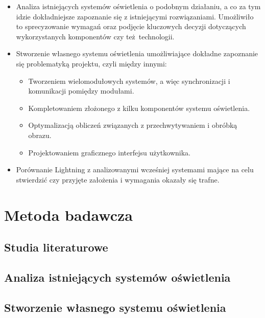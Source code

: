 \documentclass[12pt]{report}
\begin{document}
\begin{itemize}
	\item Analiza istniejących systemów oświetlenia o podobnym działaniu, a co za tym idzie dokładniejsze zapoznanie się z istniejącymi rozwiązaniami. Umożliwiło to sprecyzowanie wymagań oraz podjęcie kluczowych decyzji do\-tyczą\-cych wykorzystanych komponentów czy też technologii.
	\item Stworzenie własnego systemu oświetlenia umożliwiające dokładne zapoznanie się problematyką projektu, czyli między innymi:
	\begin{itemize}
		\item Tworzeniem wielomodułowych systemów, a więc synchronizacji i komunikacji pomiędzy modułami.
		\item Kompletowaniem złożonego z kilku komponentów systemu oświetlenia.
		\item Optymalizacją obliczeń związanych z przechwytywaniem i obróbką obrazu.
		\item Projektowaniem graficznego interfejsu użytkownika.
	\end{itemize}
	\item Porównanie Lightning z analizowanymi wcześniej systemami mające na celu stwierdzić czy przyjęte założenia i wymagania okazały się trafne.
\end{itemize}

\section{Metoda badawcza}

\subsection{Studia literaturowe}


\subsection{Analiza istniejących systemów oświetlenia}


\subsection{Stworzenie własnego systemu oświetlenia}

\end{document}
